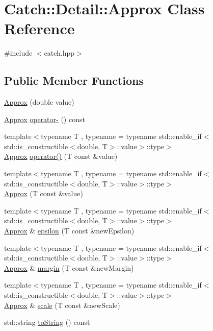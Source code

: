 \hypertarget{class_catch_1_1_detail_1_1_approx}{}\section{Catch\+::Detail\+::Approx Class Reference}
\label{class_catch_1_1_detail_1_1_approx}


{\ttfamily \#include $<$catch.\+hpp$>$}

\subsection*{Public Member Functions}
\begin{DoxyCompactItemize}
\item 
\mbox{\hyperlink{class_catch_1_1_detail_1_1_approx_a1a8618ea8db08c66bd3d9fe8f74b957a}{Approx}} (double value)
\item 
\mbox{\hyperlink{class_catch_1_1_detail_1_1_approx}{Approx}} \mbox{\hyperlink{class_catch_1_1_detail_1_1_approx_aa9adf5f05e641df770039543d5067d30}{operator-\/}} () const
\item 
{\footnotesize template$<$typename T , typename  = typename std\+::enable\+\_\+if$<$std\+::is\+\_\+constructible$<$double, T$>$\+::value$>$\+::type$>$ }\\\mbox{\hyperlink{class_catch_1_1_detail_1_1_approx}{Approx}} \mbox{\hyperlink{class_catch_1_1_detail_1_1_approx_ad8b2757f4804f9a1d3fa674efb98c20e}{operator()}} (T const \&value)
\item 
{\footnotesize template$<$typename T , typename  = typename std\+::enable\+\_\+if$<$std\+::is\+\_\+constructible$<$double, T$>$\+::value$>$\+::type$>$ }\\\mbox{\hyperlink{class_catch_1_1_detail_1_1_approx_ab14b979fa8a37f21d037157fabed4072}{Approx}} (T const \&value)
\item 
{\footnotesize template$<$typename T , typename  = typename std\+::enable\+\_\+if$<$std\+::is\+\_\+constructible$<$double, T$>$\+::value$>$\+::type$>$ }\\\mbox{\hyperlink{class_catch_1_1_detail_1_1_approx}{Approx}} \& \mbox{\hyperlink{class_catch_1_1_detail_1_1_approx_acd26adba86a066b9f40dad467f23bc85}{epsilon}} (T const \&new\+Epsilon)
\item 
{\footnotesize template$<$typename T , typename  = typename std\+::enable\+\_\+if$<$std\+::is\+\_\+constructible$<$double, T$>$\+::value$>$\+::type$>$ }\\\mbox{\hyperlink{class_catch_1_1_detail_1_1_approx}{Approx}} \& \mbox{\hyperlink{class_catch_1_1_detail_1_1_approx_a6467dc18791e1a1f4c15c4fb63cf5051}{margin}} (T const \&new\+Margin)
\item 
{\footnotesize template$<$typename T , typename  = typename std\+::enable\+\_\+if$<$std\+::is\+\_\+constructible$<$double, T$>$\+::value$>$\+::type$>$ }\\\mbox{\hyperlink{class_catch_1_1_detail_1_1_approx}{Approx}} \& \mbox{\hyperlink{class_catch_1_1_detail_1_1_approx_a8f4d2def2920a3840d3271f6d9c5ede2}{scale}} (T const \&new\+Scale)
\item 
std\+::string \mbox{\hyperlink{class_catch_1_1_detail_1_1_approx_a972fd9ac60607483263f1b0f0f9955e6}{to\+String}} () const
\end{DoxyCompactItemize}
